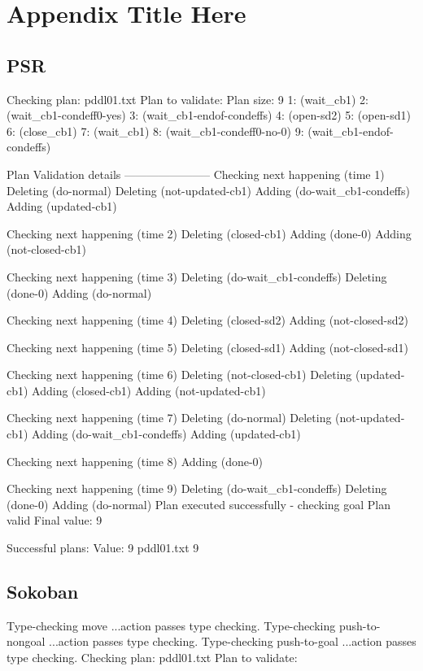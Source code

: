 
\chapter{Appendix Title Here} %

\label{AppendixB} %

\section{PSR}
Checking plan: pddl01.txt
Plan to validate:
Plan size: 9
1:
(wait_cb1) 
2:
(wait_cb1-condeff0-yes) 
3:
(wait_cb1-endof-condeffs) 
4:
(open-sd2) 
5:
(open-sd1) 
6:
(close_cb1) 
7:
(wait_cb1) 
8:
(wait_cb1-condeff0-no-0) 
9:
(wait_cb1-endof-condeffs) 

Plan Validation details
-----------------------
Checking next happening (time 1)
Deleting (do-normal)
Deleting (not-updated-cb1)
Adding (do-wait_cb1-condeffs)
Adding (updated-cb1)

Checking next happening (time 2)
Deleting (closed-cb1)
Adding (done-0)
Adding (not-closed-cb1)

Checking next happening (time 3)
Deleting (do-wait_cb1-condeffs)
Deleting (done-0)
Adding (do-normal)

Checking next happening (time 4)
Deleting (closed-sd2)
Adding (not-closed-sd2)

Checking next happening (time 5)
Deleting (closed-sd1)
Adding (not-closed-sd1)

Checking next happening (time 6)
Deleting (not-closed-cb1)
Deleting (updated-cb1)
Adding (closed-cb1)
Adding (not-updated-cb1)

Checking next happening (time 7)
Deleting (do-normal)
Deleting (not-updated-cb1)
Adding (do-wait_cb1-condeffs)
Adding (updated-cb1)

Checking next happening (time 8)
Adding (done-0)

Checking next happening (time 9)
Deleting (do-wait_cb1-condeffs)
Deleting (done-0)
Adding (do-normal)
Plan executed successfully - checking goal
Plan valid
Final value: 9 

Successful plans:
Value: 9
 pddl01.txt 9 
\section{Sokoban}
Type-checking move
...action passes type checking.
Type-checking push-to-nongoal
...action passes type checking.
Type-checking push-to-goal
...action passes type checking.
Checking plan: pddl01.txt
Plan to validate:

